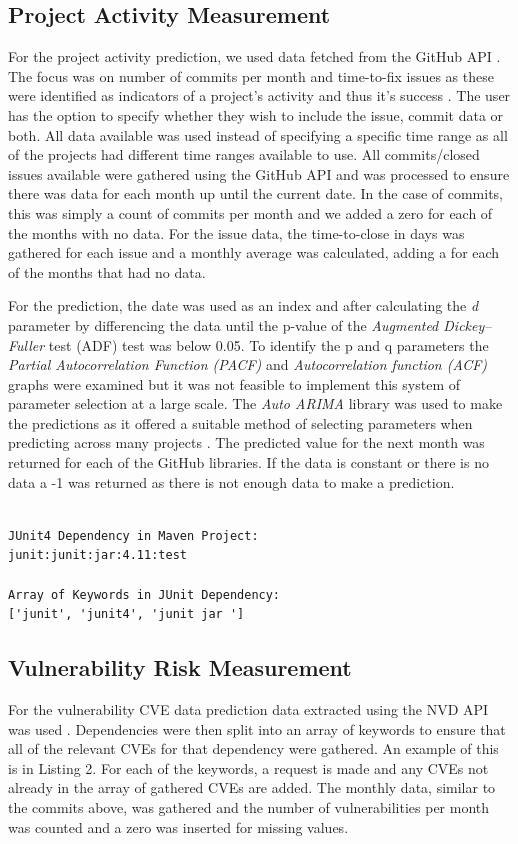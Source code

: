 \documentclass[conference]{IEEEtran}
\begin{document}
\subsection{Project Activity Measurement}
For the project activity prediction, we used data fetched from the GitHub API \cite{noauthor_github_nodate}. The focus was on number of commits per month and time-to-fix issues as these were identified as indicators of a project's activity and thus it's success \cite{sen_open_2012, chahal_fuzzy_2016}. The user has the option to specify whether they wish to include the issue, commit data or both. All data available was used instead of specifying a specific time range as all of the projects had different time ranges available to use. All commits/closed issues available were gathered using the GitHub API and was processed to ensure there was data for each month up until the current date. In the case of commits, this was simply a count of commits per month and we added a zero for each of the months with no data. For the issue data, the time-to-close in days was gathered for each issue and a monthly average was calculated, adding a  for each of the months that had no data. 

For the prediction, the date was used as an index and after calculating the \textit{d} parameter by differencing the data until the p-value of the \textit{Augmented Dickey–Fuller} test (ADF) test was below 0.05. To identify the p and q parameters the \textit{Partial Autocorrelation Function (PACF)} and \textit{Autocorrelation function (ACF)} graphs were examined but it was not feasible to implement this system of parameter selection at a large scale. The \textit{Auto ARIMA} library was used to make the predictions as it offered a suitable method of selecting parameters when predicting across many projects \cite{noauthor_pmdarima_nodate}. The predicted value for the next month was returned for each of the GitHub libraries. If the data is constant or there is no data a -1 was returned as there is not enough data to make a prediction. 

\begin{lstlisting}[caption=Example Keywords]

JUnit4 Dependency in Maven Project:
junit:junit:jar:4.11:test

Array of Keywords in JUnit Dependency:
['junit', 'junit4', 'junit jar ']

\end{lstlisting}

\subsection{Vulnerability Risk Measurement}
For the vulnerability CVE data prediction data extracted using the NVD API was used \cite{noauthor_vulnerability_nodate}. Dependencies were then split into an array of keywords to ensure that all of the relevant CVEs for that dependency were gathered. An example of this is in Listing 2. For each of the keywords, a request is made and any CVEs not already in the array of gathered CVEs are added. The monthly data, similar to the commits above, was gathered and the number of vulnerabilities per month was counted and a zero was inserted for missing values. 
\end{document}
